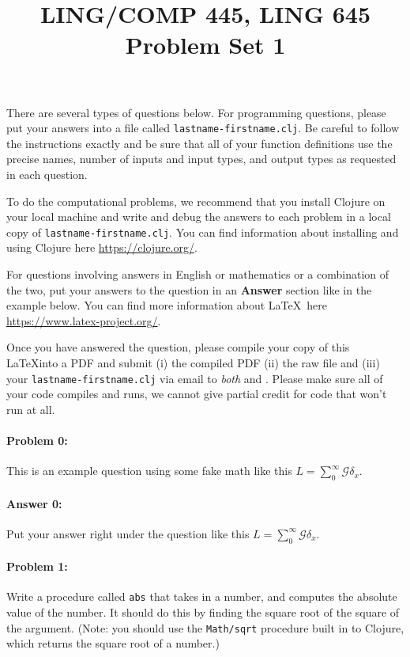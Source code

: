 \documentclass[10pt]{article}
\begin{document}
 
\title{LING/COMP 445, LING 645\\Problem Set 1}
\date{}
\maketitle


There are several types of questions below. For programming questions,
please put your answers into a file called
\texttt{lastname-firstname.clj}. Be careful to follow the instructions
exactly and be sure that all of your function definitions use the
precise names, number of inputs and input types, and output types as
requested in each question.

To do the computational problems, we recommend that you install
Clojure on your local machine and write and debug the answers to each
problem in a local copy of \texttt{lastname-firstname.clj}. You can
find information about installing and using Clojure here
\url{https://clojure.org/}.

For questions involving answers in English or mathematics or a
combination of the two, put your answers to the question in an
\textbf{Answer} section like in the example below. You can find more
information about \LaTeX\ here \url{https://www.latex-project.org/}.

Once you have answered the question, please compile your copy of this
\LaTeX into a PDF and submit (i) the compiled PDF (ii) the raw \LaTex
file and (iii) your \texttt{lastname-firstname.clj} via email to
\emph{both}  and
. Please make sure all of your
code compiles and runs, we cannot give partial credit for code that
won't run at all.


\hrulefill
\paragraph{Problem 0:}
This is an example question using some fake math like this
$L=\sum_0^{\infty} \mathcal{G} \delta_x$.

\paragraph{Answer 0:} Put your answer right under the question like
this $L=\sum_0^{\infty} \mathcal{G} \delta_x$.


\hrulefill
\paragraph{Problem 1:}
Write a procedure called \texttt{abs} that takes in a number, and
computes the absolute value of the number. It should do this by
finding the square root of the square of the argument. (Note: you
should use the \texttt{Math/sqrt} procedure built in to Clojure, which
returns the square root of a number.)
\end{document}
